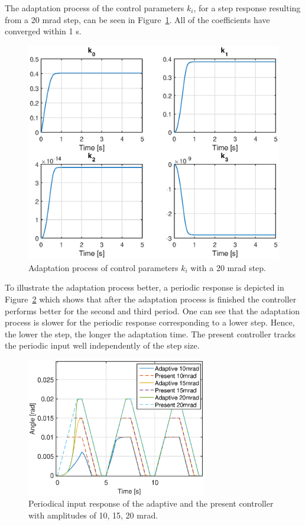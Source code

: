 The adaptation process of the control parameters $k_i$, for a step response resulting from a 20 mrad step, can be seen in Figure~\ref{fig:adapt_process}. All of the coefficients have converged within 1 s.

\begin{figure}[h!]
  \centering
  \includegraphics[width=1\textwidth]{fig/matlab/k.eps}
  \caption{\label{fig:adapt_process} Adaptation process of control parameters $k_i$ with a 20 mrad step.}
\end{figure}

\FloatBarrier
To illustrate the adaptation process better, a periodic response is depicted in Figure~\ref{fig:periodic_resp} which shows that after the adaptation process is finished the controller performs better for the second and third period. One can see that the adaptation process is slower for the periodic response corresponding to a lower step. Hence, the lower the step, the longer the adaptation time. The present controller tracks the periodic input well independently of the step size.

\begin{figure}[h!]
  \centering
  \includegraphics[width=0.7\textwidth]{fig/matlab/periodicresponse.eps}
  \caption{\label{fig:periodic_resp} Periodical input response of the adaptive and the present controller with amplitudes of 10, 15, 20 mrad.}
\end{figure}

